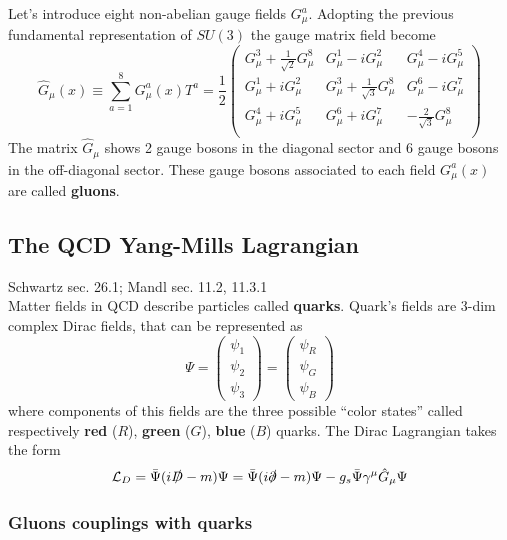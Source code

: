 \documentclass[TheoreticalPhy_ModB.tex]{subfiles}
\begin{document}
Let's introduce eight non-abelian gauge fields $G^a_\mu$. Adopting the previous fundamental representation of $SU(3)$ the gauge matrix field become
\begin{equation}\label{eqn:gluon-field-matrix}
\hat G_\mu(x)\equiv\sum_{a=1}^8G_\mu^a(x)T^a=\frac12
\begin{pmatrix}
G_\mu^3+\frac{1}{\sqrt2}G_\mu^8	& G_\mu^1-iG_\mu^2	& G_\mu^4-iG_\mu^5\\
G_\mu^1+iG_\mu^2	& G_\mu^3+\frac1{\sqrt3}G_\mu^8	& G_\mu^6-iG_\mu^7\\
G_\mu^4+iG_\mu^5	& G_\mu^6+iG_\mu^7	& -\frac2{\sqrt3}G_\mu^8\\
\end{pmatrix}
\end{equation}
The matrix $\hat G_\mu$ shows 2 gauge bosons in the diagonal sector and 6 gauge bosons in the off-diagonal sector. These gauge bosons associated to each field $G_\mu^a(x)$ are called \textbf{gluons}.


\subsection{The QCD Yang-Mills Lagrangian}
\textsf{Schwartz sec. 26.1; Mandl sec. 11.2, 11.3.1}\\

Matter fields in QCD describe particles called \textbf{quarks}. Quark's fields are 3-dim complex Dirac fields, that can be represented as
\[\Psi=\begin{pmatrix}\psi_1 \\\psi_2\\\psi_3\end{pmatrix}
=\begin{pmatrix}\psi_R \\\psi_G\\\psi_B\end{pmatrix}\]
where components of this fields are the three possible ``color states'' called respectively \textbf{red} ($R$), \textbf{green} ($G$), \textbf{blue} ($B$) quarks. The Dirac Lagrangian takes the form
\begin{equation}\label{eqn:QCD-Dirac-lag}
\mathcal L_{D}=\bar\Psi(i\slashed D-m)\Psi=\bar\Psi(i\slashed \partial-m)\Psi-g_s\bar\Psi\gamma^\mu\hat G_\mu\Psi
\end{equation}


\subsubsection{Gluons couplings with quarks}
\end{document}
